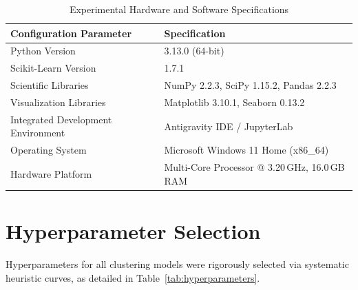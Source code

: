 \documentclass[12pt,a4paper]{article}
\begin{document}
\begin{table}[H]
\centering
\caption{Experimental Hardware and Software Specifications}
\label{tab:setup}
\begin{tabular}{ll}
\toprule
\textbf{Configuration Parameter} & \textbf{Specification} \\
\midrule
Python Version & 3.13.0 (64-bit) \\
Scikit-Learn Version & 1.7.1 \\
Scientific Libraries & NumPy 2.2.3, SciPy 1.15.2, Pandas 2.2.3 \\
Visualization Libraries & Matplotlib 3.10.1, Seaborn 0.13.2 \\
Integrated Development Environment & Antigravity IDE / JupyterLab \\
Operating System & Microsoft Windows 11 Home (x86\_64) \\
Hardware Platform & Multi-Core Processor @ 3.20\,GHz, 16.0\,GB RAM \\
\bottomrule
\end{tabular}
\end{table}

\section{Hyperparameter Selection}
Hyperparameters for all clustering models were rigorously selected via systematic heuristic curves, as detailed in Table~\ref{tab:hyperparameters}.
\end{document}
